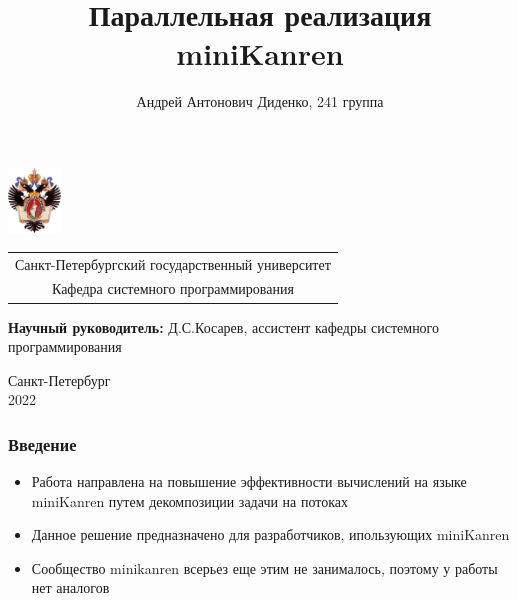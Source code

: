 \documentclass{beamer}
\title[Параллелизация miniKanren]{Параллельная реализация miniKanren}
\institute[СПбГУ]{}
\author[Андрей Диденко]{Андрей Антонович Диденко, 241 группа}
\begin{document}
{
\begin{frame}
  \includegraphics[width=1.4cm]{pictures/SPbGU_Logo.png}
  \vspace{-35pt}
  \hspace{-10pt}
  \begin{center}
    \begin{tabular}{c}
      \scriptsize{Санкт-Петербургский государственный университет} \\
      \scriptsize{Кафедра системного программирования}
    \end{tabular}
    \titlepage
  \end{center}

  \btVFill

  {\scriptsize
    {\bfseries Научный руководитель:} Д.С.Косарев, ассистент кафедры системного программирования \\
  }
  \begin{center}
    \vspace{5pt}
    \scriptsize{Санкт-Петербург\\
      2022}
  \end{center}

\end{frame}
}

\begin{frame}[fragile]
  \frametitle{Введение}
  \begin{itemize}
    \item Работа направлена на повышение эффективности вычислений на языке miniKanren путем декомпозиции задачи на потоках
    \item Данное решение предназначено для разработчиков, ипользующих miniKanren
    \item Сообщество minikanren всерьез еще этим не занималось, поэтому у работы нет аналогов
  \end{itemize}
\end{frame}
\end{document}
